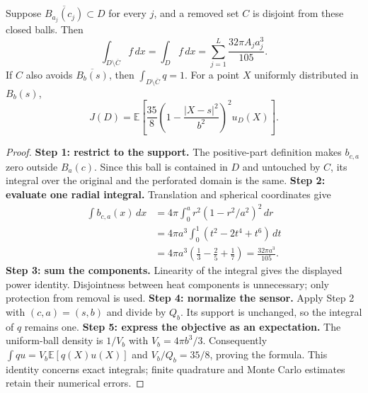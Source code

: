 \begin{proposition}
\label{prop:protectedpower}
Suppose $\overline{B_{a_j}(c_j)}\subset D$ for every $j$, and a removed set
$C$ is disjoint from these closed balls. Then
\[
 \int_{D\setminus\overline C} f\,dx
 =\int_D f\,dx
 =\sum_{j=1}^L\frac{32\pi A_j a_j^3}{105}.
\]
If $C$ also avoids $\overline{B_b(s)}$, then $\int_{D\setminus\overline C}q=1$.
For a point $X$ uniformly distributed in $B_b(s)$,
\[
 J(D)=\mathbb E\!\left[
 \frac{35}{8}\left(1-\frac{|X-s|^2}{b^2}\right)^2u_D(X)\right].
\]
\end{proposition}
\begin{proof}
\textbf{Step 1: restrict to the support.}
The positive-part definition makes $b_{c,a}$ zero outside $B_a(c)$.
Since this ball is contained in $D$ and untouched by $C$, its integral over
the original and the perforated domain is the same.
\textbf{Step 2: evaluate one radial integral.}
Translation and spherical coordinates give
\begin{align*}
 \int b_{c,a}(x)\,dx
 &=4\pi\int_0^a r^2(1-r^2/a^2)^2\,dr\\
 &=4\pi a^3\int_0^1(t^2-2t^4+t^6)\,dt\\
 &=4\pi a^3\left(\frac13-\frac25+\frac17\right)
 =\frac{32\pi a^3}{105}.
\end{align*}
\textbf{Step 3: sum the components.}
Linearity of the integral gives the displayed power identity. Disjointness
between heat components is unnecessary; only protection from removal is used.
\textbf{Step 4: normalize the sensor.}
Apply Step 2 with $(c,a)=(s,b)$ and divide by $Q_b$. Its support is unchanged,
so the integral of $q$ remains one.
\textbf{Step 5: express the objective as an expectation.}
The uniform-ball density is $1/V_b$ with $V_b=4\pi b^3/3$.
Consequently $\int q u=V_b\mathbb E[q(X)u(X)]$ and
$V_b/Q_b=35/8$, proving the formula. This identity concerns exact integrals;
finite quadrature and Monte Carlo estimates retain their numerical errors.
\end{proof}

